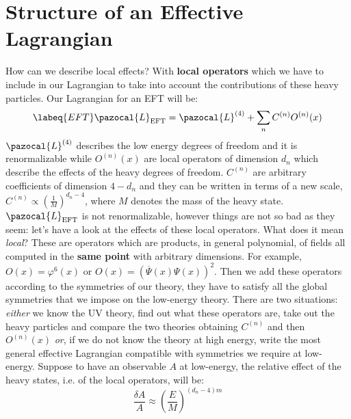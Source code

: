 \documentclass[../main.tex]{subfiles}
\begin{document}
\section{Structure of an Effective Lagrangian}
How can we describe local effects? With \textbf{local operators} which we have to include in our Lagrangian to take into account the contributions of these heavy particles. Our Lagrangian for an EFT will be:
\begin{equation}
\labeq{EFT}
\pazocal{L}_{\text{EFT}}=\pazocal{L}^{(4)}+\sum_n C^{(n)}O^{(n)}(x)
\end{equation}%
$\pazocal{L}^{(4)}$ describes the low energy degrees of freedom and it is renormalizable while $O^{(n)}(x)$ are local operators of dimension $d_n$ which describe the effects of the heavy degrees of freedom. $C^{(n)}$ are arbitrary coefficients of dimension $4-d_n$ and they can be written in terms of a new scale, $C^{(n)}\propto\left(\frac{1}{M}\right)^{d_n-4}$, where $M$ denotes the mass of the heavy state. $\pazocal{L}_{\text{EFT}}$ is not renormalizable, however things are not so bad as they seem: let's have a look at the effects of these local operators. What does it mean \textit{local}? These are operators which are products, in general polynomial, of fields all computed in the \textbf{same point} with arbitrary dimensions. For example, $O(x)=\varphi^6(x)$ or $O(x)=(\overline{\Psi}(x)\Psi(x))^2$. Then we add these operators according to the symmetries of our theory, they have to satisfy all the global symmetries that we impose on the low-energy theory. There are two situations: \textit{either} we know the UV theory, find out what these operators are, take out the heavy particles and compare the two theories obtaining $C^{(n)}$ and then $O^{(n)}(x)$ \textit{or}, if we do not know the theory at high energy, write the most general effective Lagrangian compatible with symmetries we require at low-energy. Suppose to have an observable $A$ at low-energy, the relative effect of the heavy states, i.e. of the local operators, will be:
\[
\frac{\delta A}{A}\approx\left(\frac{E}{M}\right)^{(d_n-4)m}
\]
\end{document}
